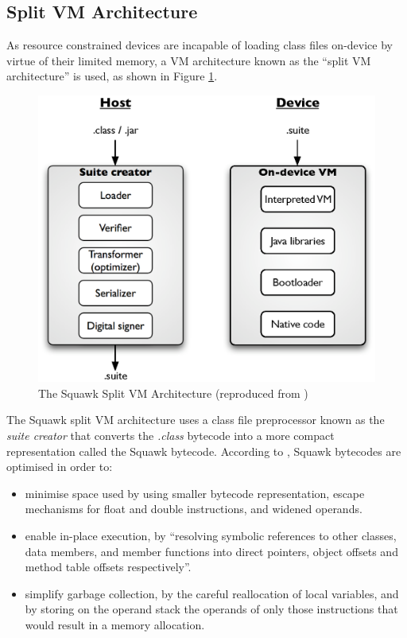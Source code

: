 \subsection{Split VM Architecture}

As resource constrained devices are incapable of loading class files on-device
by virtue of their limited memory, a VM architecture known as the ``split VM
architecture'' is used, as shown in Figure
\ref{Fig:SquawkVM_architecture}.

\begin{figure}[h]
\centering
\includegraphics[scale=0.61]{img/Squawk_architecture.eps} 
\caption[The Squawk Split VM Architecture]{The Squawk
Split VM Architecture (reproduced from \cite{simon_squawk:2006})}
\label{Fig:SquawkVM_architecture}
\end{figure}  

The Squawk split VM architecture uses a class file preprocessor known as the
\emph{suite creator} that converts the \emph{.class} bytecode into a more
compact representation called the Squawk bytecode. According to
\cite{simon_squawk:2006}, Squawk bytecodes are optimised in order to:
\begin{itemize}
\item minimise space used by using smaller bytecode representation, escape
mechanisms for float and double instructions, and widened operands. 
\item enable in-place execution, by ``resolving symbolic references to other
classes, data members, and member functions into direct pointers, object offsets
and method table offsets respectively''.
\item simplify garbage collection, by the careful reallocation of local
variables, and by storing on the operand stack the operands of only those instructions that would result in a memory allocation.
\end{itemize}

